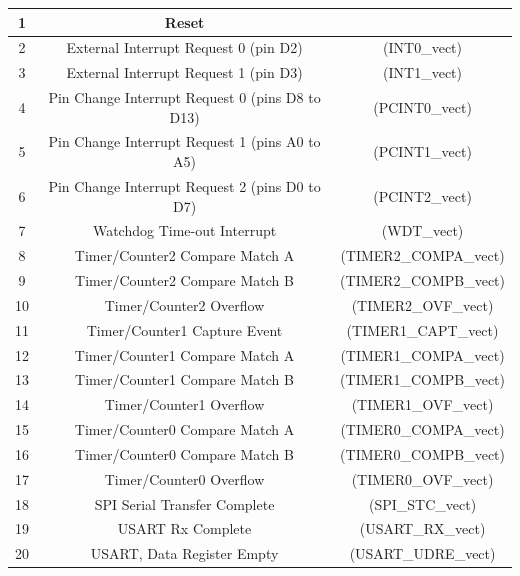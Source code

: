 \documentclass[a4paper,12pt,portuguese]{ufms-cpcx}
\begin{document}
\begin{table}[!h]
	\renewcommand{\arraystretch}{1.3}
	\centering
	\begin{tabular}{|c|cc|}
		\hline
		1  &                      Reset                      &  \\ \hline
		2  &     External Interrupt Request 0  (pin D2)      &     (INT0_vect)     \\ \hline
		3  &     External Interrupt Request 1  (pin D3)      &     (INT1_vect)     \\ \hline
		4  & Pin Change Interrupt Request 0 (pins D8 to D13) &    (PCINT0_vect)    \\ \hline
		5  & Pin Change Interrupt Request 1 (pins A0 to A5)  &    (PCINT1_vect)    \\ \hline
		6  & Pin Change Interrupt Request 2 (pins D0 to D7)  &    (PCINT2_vect)    \\ \hline
		7  &           Watchdog Time-out Interrupt           &     (WDT_vect)      \\ \hline
		8  &         Timer/Counter2 Compare Match A          & (TIMER2_COMPA_vect) \\ \hline
		9  &         Timer/Counter2 Compare Match B          & (TIMER2_COMPB_vect) \\ \hline
		10 &             Timer/Counter2 Overflow             &  (TIMER2_OVF_vect)  \\ \hline
		11 &          Timer/Counter1 Capture Event           & (TIMER1_CAPT_vect)  \\ \hline
		12 &         Timer/Counter1 Compare Match A          & (TIMER1_COMPA_vect) \\ \hline
		13 &         Timer/Counter1 Compare Match B          & (TIMER1_COMPB_vect) \\ \hline
		14 &             Timer/Counter1 Overflow             &  (TIMER1_OVF_vect)  \\ \hline
		15 &         Timer/Counter0 Compare Match A          & (TIMER0_COMPA_vect) \\ \hline
		16 &         Timer/Counter0 Compare Match B          & (TIMER0_COMPB_vect) \\ \hline
		17 &             Timer/Counter0 Overflow             &  (TIMER0_OVF_vect)  \\ \hline
		18 &          SPI Serial Transfer Complete           &   (SPI_STC_vect)    \\ \hline
		19 &                USART Rx Complete                &   (USART_RX_vect)   \\ \hline
		20 &           USART, Data Register Empty            &  (USART_UDRE_vect)  \\ \hline

\end{tabular}
\end{table}
\end{document}
